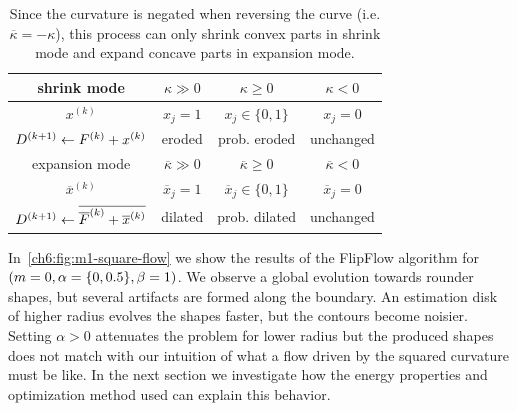 %
%
\begin{table}
  \center
  \setlength{\extrarowheight}{0.75em}
  \begin{tabular}{|c|c|c|c|} \hline
    shrink mode &    $\kappa \gg 0$ & $\kappa \geq 0$ &  $\kappa < 0$ \\ \hline
    $x^{(k)}$ & $x_j=1$ & $x_j \in \{0,1\}$ & $x_j=0$ \\ \hline
    $D^{(k+1)} \leftarrow F^{(k)} + x^{(k)}$ & eroded & prob. eroded & unchanged  \\ \hline \hline
    expansion mode &    $\overline{\kappa} \gg 0$ & $\overline{\kappa} \geq 0$ & $\overline{\kappa} < 0$ \\ \hline
    $\overline{x}^{(k)}$ & $\overline{x}_j=1$ & $\overline{x}_j \in \{0,1\}$ & $\overline{x}_j=0$ \\ \hline
    $D^{(k+1)} \leftarrow \overline{\overline{F}^{(k)} + \overline{x}^{(k)}}$ & dilated & prob. dilated & unchanged \\ \hline 
  \end{tabular}
  
  \caption{  Since the curvature is negated when reversing the curve (i.e. $\overline{\kappa}=-\kappa$), this process can only shrink  convex parts in shrink mode and expand concave parts in expansion mode.}
   \label{tab:flow-summary}	  

\end{table}


In~\cref{ch6:fig:m1-square-flow} we show the results of the FlipFlow algorithm for $( {\color{black}{m=0}}, \alpha=\{0, 0.5\}, \beta=1 )$. We observe a global evolution towards rounder shapes, but several artifacts are formed along the boundary. An estimation disk of higher radius evolves the shapes faster, but the contours become noisier. Setting $\alpha >0$ attenuates the problem for lower radius but the produced shapes does not match with our intuition of what a flow driven by the squared curvature must be like. In the next section we investigate how the energy properties and optimization method used can explain this behavior.

